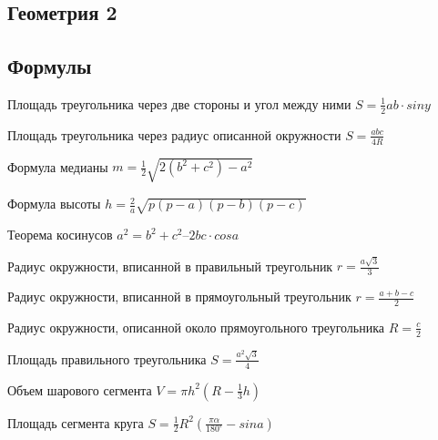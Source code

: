 \documentclass[a4paper]{article}
\begin{document}
\begin{multicols*}{2}
		  \section{Геометрия 2}
		  
		  \subsection{Формулы}
		  Площадь треугольника через две стороны и
		  угол между ними
$S = \frac{1}{2}ab\cdot siny$
		  
		 Площадь треугольника через радиус
		 описанной окружности $ S = \frac{abc}{4R} $
		 
		 Формула медианы 
		 $ m = \frac{1}{2} \sqrt{2(b^2 + c^ 2) - a^2}$
		 
		 Формула высоты
		 $ h = \frac{2}{a} \sqrt{p(p-a)(p-b)(p-c)} $
		 
		 Теорема косинусов
		 $ a^2 = b^2 + c^2 – 2bc\cdot cos a$
		 
		 Радиус окружности, вписанной в правильный
		 треугольник
		 $r = \frac{a\sqrt{3}}{3} $
		 
		 Радиус окружности, вписанной в
		 прямоугольный треугольник
		 $r = \frac{a+b-c}{2} $
		 
		 Радиус окружности, описанной около
		 прямоугольного треугольника
		 $R = \frac{c}{2} $
		 
		 Площадь правильного треугольника
		 $ S = \frac{a^2 \sqrt{3}}{4} $
		 
		 Объем шарового сегмента
		 $ V = \pi h^2(R-\frac{1}{3}h) $
		 
		 Площадь сегмента круга
		 $ S = \frac{1}{2}R^2(\frac{\pi\alpha}{180^{\circ}} - sin a) $
		 

\end{multicols*}
\end{document}

